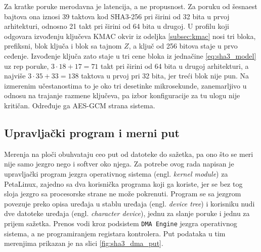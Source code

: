 Za kratke poruke merodavna je latencija, a ne propusnost. Za poruku od šesnaest bajtova ona iznosi 39 taktova kod SHA3-256 pri širini od 32 bita u prvoj arhitekturi, odnosno 21 takt pri širini od 64 bita u drugoj. U profilu koji odgovara izvođenju ključeva KMAC okvir iz odeljka \ref{subsec:kmac} nosi tri bloka, prefiksni, blok ključa i blok sa tajnom $Z$, a ključ od 256 bitova staje u prvo ceđenje. Izvođenje ključa zato staje u tri cene bloka iz jednačine \eqref{eq:sha3_model} uz rep poruke, $3 \cdot 18 + 17 = 71$ takt pri širini od 64 bita u drugoj arhitekturi, a najviše $3 \cdot 35 + 33 = 138$ taktova u prvoj pri 32 bita, jer treći blok nije pun. Na izmerenim učestanostima to je oko tri desetinke mikrosekunde, zanemarljivo u odnosu na trajanje razmene ključeva, pa izbor konfiguracije za tu ulogu nije kritičan. Određuje ga AES-GCM strana sistema.

\subsection{Upravljački program i merni put}
\label{subsec:rez_sha3_drajver}

Merenja na ploči obuhvataju ceo put od datoteke do sažetka, pa ono što se meri nije samo jezgro nego i softver oko njega. Za potrebe ovog rada napisan je upravljački program jezgra operativnog sistema (engl. \textit{kernel module}) za PetaLinux, zajedno sa dva korisnička programa koji ga koriste, jer se bez tog sloja jezgro sa procesorske strane ne može pokrenuti.
\smallbreak
Program se sa jezgrom povezuje preko opisa uređaja u stablu uređaja (engl. \textit{device tree}) i korisniku nudi dve datoteke uređaja (engl. \textit{character device}), jednu za slanje poruke i jednu za prijem sažetka. Prenos vodi kroz podsistem \texttt{DMA Engine} jezgra operativnog sistema, a ne programiranjem registara kontrolera. Put podataka u tim merenjima prikazan je na slici \ref{fig:sha3_dma_put}.

